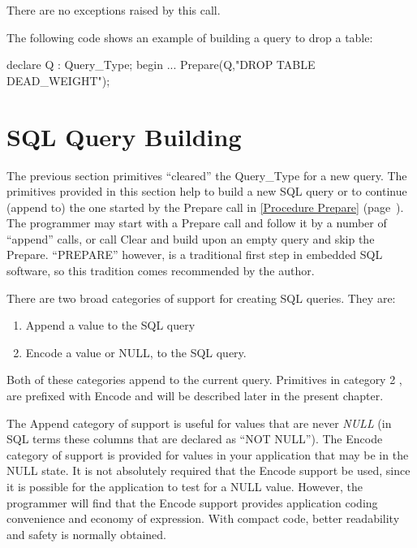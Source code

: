 \documentclass[english,letterpaper]{book}
\newcommand\Ref[1]{\textsection\ref{#1} (page~\pageref{#1})}
\begin{document}
There are no exceptions raised by this call.

The following code shows an example of building a query to drop a
table:

\begin{Example}
declare
   Q : Query_Type;
begin
   ...
   Prepare(Q,"DROP TABLE DEAD_WEIGHT");
\end{Example}

\section{SQL Query Building \label{SQL Query Building}}

The previous section primitives ``cleared'' the Query\_Type for
a new query. The primitives provided in this section help to build
a new SQL query or to continue (append to) the one started by the
Prepare call in \Ref{Procedure Prepare}. The programmer may
start with a Prepare call and follow it by a number of ``append''
calls, or call Clear and build upon an empty query and skip the
Prepare. ``PREPARE'' however, is a traditional first step
in embedded SQL software, so this tradition comes recommended
by the author.

There are two broad categories of support for creating SQL queries.
They are:

\begin{enumerate}
   \item Append a value to the SQL query
   \item Encode a value or NULL, to the SQL query.
\end{enumerate}

Both of these categories append to the current query. Primitives in
category 2 , are prefixed with Encode and will be described
later in the present chapter. 

The Append category of support is useful for values that are never
\emph{NULL} (in SQL terms these columns that are declared as ``NOT
NULL''). The Encode category of support is provided for values in
your application that may be in the NULL state. It is not absolutely
required that the Encode support be used, since it is possible for
the application to test for a NULL value. However, the programmer
will find that the Encode support provides application coding convenience
and economy of expression. With compact code, better readability and
safety is normally obtained.
\end{document}
